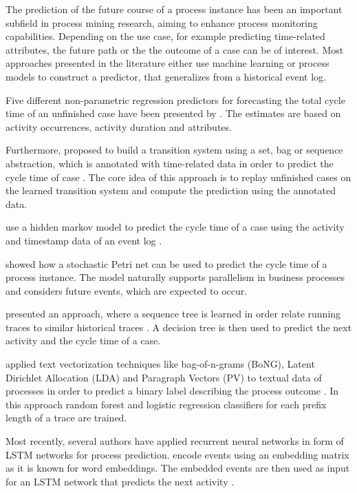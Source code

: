 
The prediction of the future course of a process instance has been an important subfield in process mining research, aiming to enhance process monitoring capabilities.
Depending on the use case, for example predicting time-related attributes, the future path or the the outcome of a case can be of interest.
Most approaches presented in the literature either use machine learning or process models to construct a predictor, that generalizes from a historical event log.

Five different non-parametric regression predictors for forecasting the total cycle time of an unfinished case have been presented by  \cite{DBLP:conf/otm/DongenCA08}.
The estimates are based on activity occurrences, activity duration and attributes.

Furthermore,  proposed to build a transition system using a set, bag or sequence abstraction, which is annotated with time-related data in order to predict the cycle time of case \cite{DBLP:journals/is/AalstSS11}.
The core idea of this approach is to replay unfinished cases on the learned transition system and compute the prediction using the annotated data.

\citeauthor{DBLP:conf/colcom/PandeyNC11} use a hidden markov model to predict the cycle time of a case using the activity and timestamp data of an event log \cite{DBLP:conf/colcom/PandeyNC11}.

\citeauthor{DBLP:conf/icsoc/Rogge-SoltiW13} showed how a stochastic Petri net can be used to predict the cycle time of a process instance.
The model naturally supports parallelism in business processes and considers future events, which are expected to occur. 

\citeauthor{DBLP:conf/dis/CeciLFCM14} presented an approach, where a sequence tree is learned in order relate running traces to similar historical traces \cite{DBLP:conf/dis/CeciLFCM14}.
A decision tree is then used to predict the next activity and the cycle time of a case.

\citeauthor{DBLP:conf/bpm/TeinemaaDMF16} applied text vectorization techniques like bag-of-n-grams (BoNG), Latent Dirichlet Allocation (LDA) and Paragraph Vectors (PV) to textual data of processes in order to predict a binary label describing the process outcome \cite{DBLP:conf/bpm/TeinemaaDMF16}.
In this approach random forest and logistic regression classifiers for each prefix length of a trace are trained.

Most recently, several authors have applied recurrent neural networks in form of LSTM networks for process prediction. \citeauthor{ DBLP:conf/bpm/EvermannRF16} encode events using an embedding matrix as it is known for word embeddings. The embedded events are then used as input for an LSTM network that predicts the next activity \cite{DBLP:conf/bpm/EvermannRF16}.

